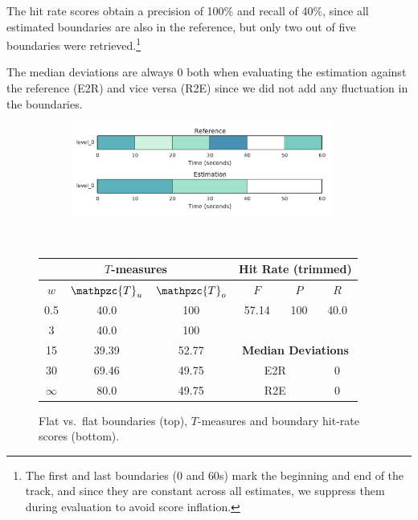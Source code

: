 \documentclass{article}
\def\shag{\ensuremath{\mathpzc{T}}}
\begin{document}
The hit rate scores obtain a precision of 100\% and recall of 40\%, since all estimated boundaries are also 
in the reference, but only two out of five boundaries were retrieved.\footnote{The first and last boundaries ($0$ and $60$s) mark the beginning and end of the track, and since they 
are constant across all estimates, we suppress them during evaluation to avoid score inflation.}

The median deviations are always 0 both when evaluating the estimation against the reference (E2R) and vice
versa (R2E) since we did not add any fluctuation in the boundaries.

\begin{figure}
  \centering
  \begin{subfigure}{0.5\textwidth}
    \centering
    \includegraphics[width=0.94\textwidth]{figs/flat-flat.pdf}
  \end{subfigure}%
  \\
  \begin{minipage}{0.5\textwidth}
    \centering
    \vspace{10pt}
    \begin{tabular}{|c|c|c||c|c|c|}
      \hline
      \multicolumn{3}{|c||}{\textbf{$T$-measures}} & \multicolumn{3}{c|}{\textbf{Hit Rate (trimmed)}} \\
      \hline
      $w$ & $\shag_u$   & $\shag_o$ & $F$     & $P$     & $R$ \\
      \hline
      0.5       & 40.0   & 100   & 57.14  & 100 & 40.0 \\
      \cline{4-6}
      3         & 40.0   & 100  \\
      \cline{4-6}
      15        & 39.39  & 52.77 & \multicolumn{3}{c|}{\textbf{Median Deviations}}   \\
      \cline{4-6}
      30        & 69.46  & 49.75 & \multicolumn{2}{c|}{E2R} & 0 \\
      $\infty$  & 80.0   & 49.75 & \multicolumn{2}{c|}{R2E} & 0 \\  
      \hline
    \end{tabular}
  \end{minipage}
  \caption{Flat vs.\ flat boundaries (top), $T$-measures and boundary hit-rate
  scores (bottom).}
  \label{fig:flat-flat}
\end{figure}
\end{document}
